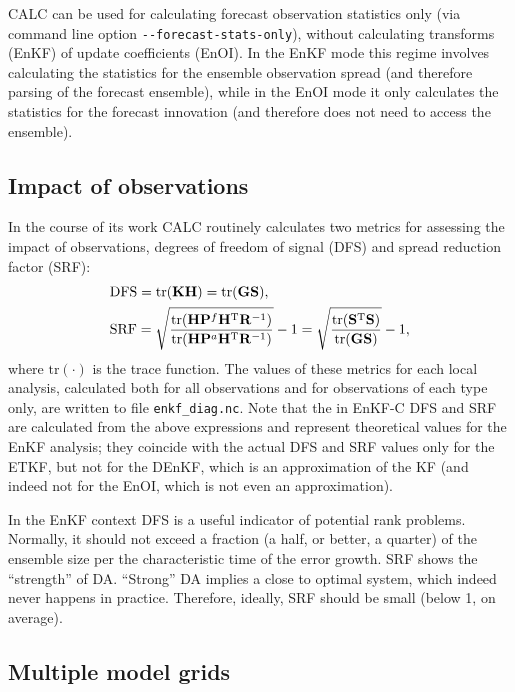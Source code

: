 \documentclass[11pt]{report}
\newcommand{\mb} {\mathbf}
\newcommand{\T}{^{\tiny \mathrm T}}
\begin{document}
CALC can be used for calculating forecast observation statistics only (via command line option \verb|--forecast-stats-only|), without calculating transforms (EnKF) of update coefficients (EnOI).
In the EnKF mode this regime involves calculating the statistics for the ensemble observation spread (and therefore parsing of the forecast ensemble), while in the EnOI mode it only calculates the statistics for the forecast innovation (and therefore does not need to access the ensemble).

\subsection{Impact of observations}
\label{sec:impact}

In the course of its work CALC routinely calculates two metrics for assessing the impact of observations, degrees of freedom of signal (DFS) and spread reduction factor (SRF):
\begin{align*}
  & \mathrm{DFS} = \mathrm{tr}(\mb K \mb H) = \mathrm{tr}(\mb G \mb S), \\
  & \mathrm{SRF} = \sqrt{\frac{\mathrm{tr}(\mb H \mb P^f \mb H\T \mb R^{-1})}{\mathrm{tr}(\mb H \mb P^a \mb H\T \mb R^{-1})}} - 1 = \sqrt{\frac{\mathrm{tr}(\mb S\T \mb S)}{\mathrm{tr}(\mb G \mb S)}} - 1,
\end{align*}
where $\mathrm{tr}(\cdot)$ is the trace function.
The values of these metrics for each local analysis, calculated both for all observations and for observations of each type only, are written to file \verb|enkf_diag.nc|.
Note that the in EnKF-C DFS and SRF are calculated from the above expressions and represent theoretical values for the EnKF analysis; they coincide with the actual DFS and SRF values only for the ETKF, but not for the DEnKF, which is an approximation of the KF (and indeed not for the EnOI, which is not even an approximation).

In the EnKF context DFS is a useful indicator of potential rank problems.
Normally, it should not exceed a fraction (a half, or better, a quarter) of the ensemble size per the characteristic time of the error growth.
SRF shows the ``strength'' of DA.
``Strong'' DA implies a close to optimal system, which indeed never happens in practice.
Therefore, ideally, SRF should be small (below 1, on average).

\subsection{Multiple model grids}
\end{document}
